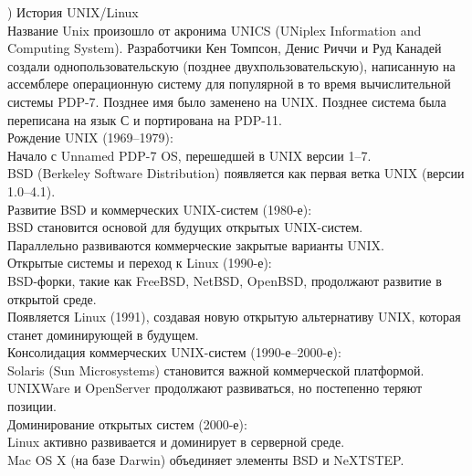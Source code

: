 ) История UNIX/Linux \\
Название Unix произошло от акронима UNICS (UNiplex Information and Computing System). Разработчики Кен Томпсон, Денис Риччи и Руд Канадей создали однопользовательскую (позднее двухпользовательскую), написанную на ассемблере операционную систему для популярной в то время вычислительной системы PDP-7. Позднее имя было заменено на UNIX. Позднее система была переписана на язык С и портирована на PDP-11. \\
Рождение UNIX (1969–1979): \\
Начало с Unnamed PDP-7 OS, перешедшей в UNIX версии 1–7. \\
BSD (Berkeley Software Distribution) появляется как первая ветка UNIX (версии 1.0–4.1). \\
Развитие BSD и коммерческих UNIX-систем (1980-е): \\
BSD становится основой для будущих открытых UNIX-систем. \\
Параллельно развиваются коммерческие закрытые варианты UNIX. \\
Открытые системы и переход к Linux (1990-е): \\
BSD-форки, такие как FreeBSD, NetBSD, OpenBSD, продолжают развитие в открытой среде. \\
Появляется Linux (1991), создавая новую открытую альтернативу UNIX, которая станет доминирующей в будущем. \\
Консолидация коммерческих UNIX-систем (1990-е–2000-е): \\
Solaris (Sun Microsystems) становится важной коммерческой платформой. \\
UNIXWare и OpenServer продолжают развиваться, но постепенно теряют позиции. \\
Доминирование открытых систем (2000-е): \\
Linux активно развивается и доминирует в серверной среде. \\
Mac OS X (на базе Darwin) объединяет элементы BSD и NeXTSTEP. \\

